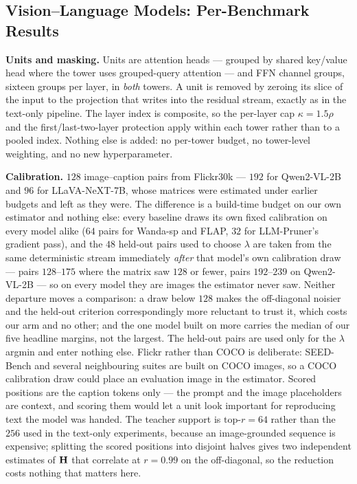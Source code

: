 \subsection{Vision--Language Models: Per-Benchmark Results}
\label{app:vlm}

\textbf{Units and masking.} Units are attention heads --- grouped by shared key/value head where the
tower uses grouped-query attention --- and FFN channel groups, sixteen groups per layer, in
\emph{both} towers. A unit is removed by zeroing its slice of the input to the projection that writes
into the residual stream, exactly as in the text-only pipeline. The layer index is composite, so the
per-layer cap $\kappa{=}1.5\rho$ and the first/last-two-layer protection apply within each tower
rather than to a pooled index. Nothing else is added: no per-tower budget, no tower-level weighting,
and no new hyperparameter.

\textbf{Calibration.} $128$ image--caption pairs from Flickr30k \citep{young2014flickr30k} --- $192$ for Qwen2-VL-2B and $96$
for LLaVA-NeXT-7B, whose matrices were estimated under earlier budgets and left as they were. The
difference is a build-time budget on our own estimator and nothing else: every baseline draws its own
fixed calibration on every model alike ($64$ pairs for Wanda-sp and FLAP, $32$ for LLM-Pruner's
gradient pass), and the $48$ held-out pairs used to choose $\lambda$ are taken from the same
deterministic stream immediately \emph{after} that model's own calibration draw --- pairs
$128$--$175$ where the matrix saw $128$ or fewer, pairs $192$--$239$ on Qwen2-VL-2B --- so on every
model they are images the estimator never saw. Neither departure moves a comparison: a draw below
$128$ makes the off-diagonal noisier and the held-out criterion correspondingly more reluctant to
trust it, which costs our arm and no other; and the one model built on more carries the median of
our five headline margins, not the largest. The held-out pairs are used only for the $\lambda$ argmin and
enter nothing else. Flickr rather than COCO
is deliberate: SEED-Bench and several neighbouring suites are built on COCO images, so a COCO
calibration draw could place an evaluation image in the estimator. Scored positions are the caption
tokens only --- the prompt and the image placeholders are context, and scoring them would let a unit
look important for reproducing text the model was handed. The teacher support is
$\mathrm{top}\text{-}r{=}64$ rather than the $256$ used in the text-only experiments, because an
image-grounded sequence is expensive; splitting the scored positions into disjoint halves gives two
independent estimates of $\mathbf{H}$ that correlate at $r{=}0.99$ on the off-diagonal, so the reduction
costs nothing that matters here.

